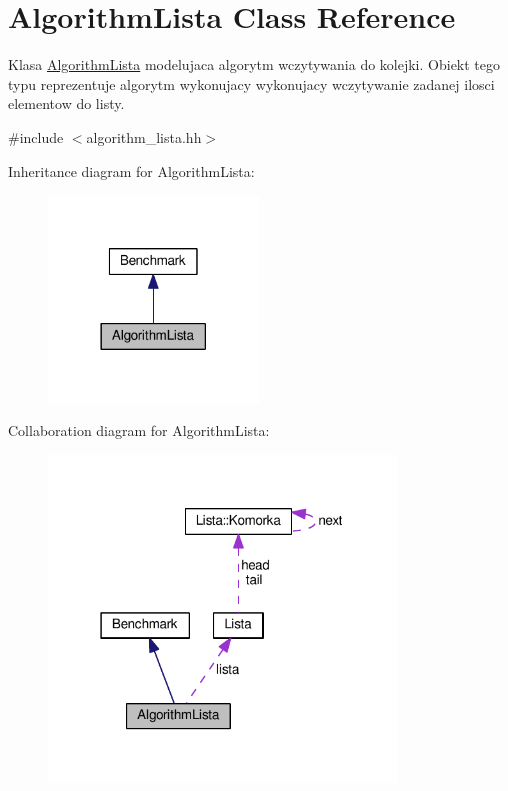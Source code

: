 \hypertarget{class_algorithm_lista}{}\section{Algorithm\+Lista Class Reference}
\label{class_algorithm_lista}


Klasa \hyperlink{class_algorithm_lista}{Algorithm\+Lista} modelujaca algorytm wczytywania do kolejki. Obiekt tego typu reprezentuje algorytm wykonujacy wykonujacy wczytywanie zadanej ilosci elementow do listy.  




{\ttfamily \#include $<$algorithm\+\_\+lista.\+hh$>$}



Inheritance diagram for Algorithm\+Lista\+:\nopagebreak
\begin{figure}[H]
\begin{center}
\leavevmode
\includegraphics[width=158pt]{class_algorithm_lista__inherit__graph}
\end{center}
\end{figure}


Collaboration diagram for Algorithm\+Lista\+:\nopagebreak
\begin{figure}[H]
\begin{center}
\leavevmode
\includegraphics[width=262pt]{class_algorithm_lista__coll__graph}
\end{center}
\end{figure}
